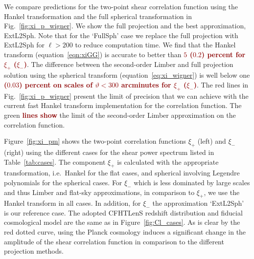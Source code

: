 \documentclass[fleqn,usenatbib]{mnras} %
\newcommand{\forref}[1]{{\bf\textcolor{darkred}{#1}}}
\begin{document}
We compare predictions for the two-point shear correlation function using
the Hankel transformation and the full spherical transformation in
Fig.~\ref{fig:xi_p_wigner}. We show the full projection and the best
approximation, ExtL2Sph. Note that for the `FullSph' case we replace the full
projection with ExtL2Sph for $\ell > 200$ to reduce computation time.
%
We find that the Hankel transform (equation~\ref{eqn:xiGG}) is accurate to better than \forref{$5$ ($0.2$) percent
for $\xi_+$ ($\xi_-$)}.
%
The difference between the second-order Limber and full projection solution using the
spherical transform (equation~\ref{eq:xi_wigner}) is well below one \forref{($0.03$) percent
on scales of $\vartheta < 300$ arcminutes for $\xi_+$ ($\xi_-$)}.
The red lines in Fig.~\ref{fig:xi_p_wigner} present the limit of
precision that we can achieve with the current fast Hankel transform implementation
for the correlation function. The green \forref{lines show} the limit of the
second-order Limber approximation on the correlation function.

Figure~\ref{fig:xi_pm} shows the two-point correlation functions $\xi_+$ (left)
and $\xi_-$ (right) using the different cases for the shear power spectrum
listed in Table~\ref{tab:cases}. The component $\xi_+$ is calculated with the
appropriate transformation, i.e.~Hankel for the flat cases, and {spherical
involving Legendre polynomials} for the spherical cases. For $\xi_-$ which is
less dominated by large scales and thus Limber and flat-sky approximations, in
comparison to $\xi_+$, we use the Hankel transform in all cases. In addition,
for $\xi_-$ the approximation `ExtL2Sph' is our reference case. The adopted
CFHTLenS redshift distribution and fiducial cosmological model are the same as
in Figure~\ref{fig:Cl_cases}. As is clear by the red dotted curve, using the
Planck cosmology \citep{2015arXiv150201589P} induces a significant change in
the amplitude of the shear correlation function in comparison to the different
projection methods.
\end{document}
